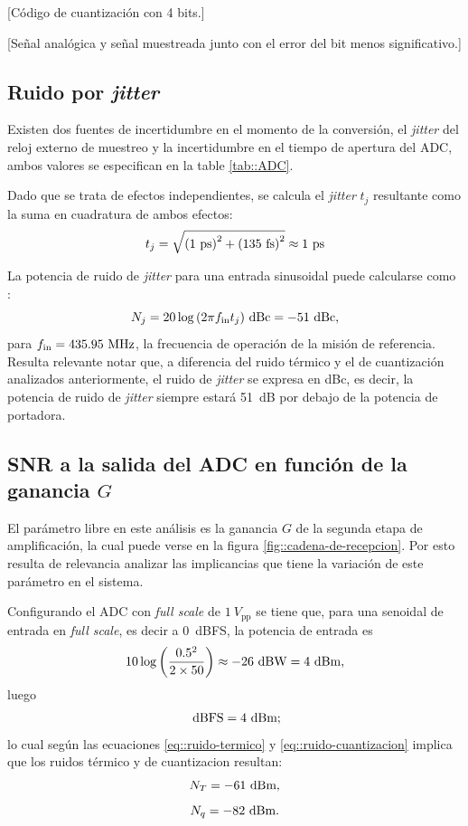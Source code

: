 \documentclass[../../main.tex]{subfiles}
\begin{document}
[Código de cuantización con 4 bits.]

[Señal analógica y señal muestreada junto con el error del bit menos significativo.]

\subsection{Ruido por \textit{jitter}}
Existen dos fuentes de incertidumbre en el momento de la conversión, el \textit{jitter} del reloj externo de muestreo y la incertidumbre en el tiempo de apertura del ADC, ambos valores se especifican en la table \ref{tab::ADC}.

Dado que se trata de efectos independientes, se calcula el \textit{jitter} $t_j$ resultante como la suma en cuadratura de ambos efectos:
\[t_j = \sqrt{{(1~\textrm{ps})}^2 + {(135~\textrm{fs})}^2} \approx 1~\textrm{ps}\]

La potencia de ruido de \textit{jitter} para una entrada sinusoidal puede calcularse como \cite{formula-jitter}:
\begin{equation}
    N_j = 20 \log{\left(2 \pi  f_{\textrm{in}} t_j\right)}~\textrm{dBc} = -51~\textrm{dBc},
    \label{eq::jitter-formula}
\end{equation}
para $f_{\textrm{in}} = 435.95~\textrm{MHz}$, la frecuencia de operación de la misión de referencia. Resulta relevante notar que, a diferencia del ruido térmico y el de cuantización analizados anteriormente, el ruido de \textit{jitter} se expresa en dBc, es decir, la potencia de ruido de \textit{jitter} siempre estará 51~dB por debajo de la potencia de portadora.

\subsection{SNR a la salida del ADC en función de la ganancia $G$}
El parámetro libre en este análisis es la ganancia $G$ de la segunda etapa de amplificación, la cual puede verse en la figura \ref{fig::cadena-de-recepcion}. Por esto resulta de relevancia analizar las implicancias que tiene la variación de este parámetro en el sistema.

Configurando el ADC con \textit{full scale} de $1~V_\textrm{pp}$ se tiene que, para una senoidal de entrada en \textit{full scale}, es decir a 0~dBFS, la potencia de entrada es
\[10 \log{\left(\frac{0.5^2}{2 \times 50}\right)} \approx -26~\textrm{dBW} = 4~\textrm{dBm},\] luego \[~\textrm{dBFS} = 4~\textrm{dBm};\]
lo cual según las ecuaciones \ref{eq::ruido-termico} y \ref{eq::ruido-cuantizacion} implica que los ruidos térmico y de cuantizacion resultan:
\[N_T = -61~\textrm{dBm},\] \[N_q = -82~\textrm{dBm}.\]
\end{document}
